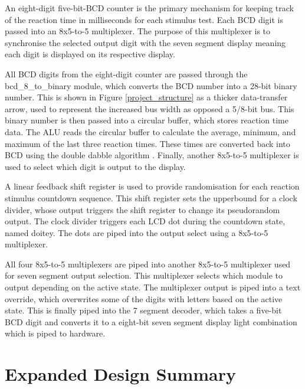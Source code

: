 \documentclass[11pt]{article}
\begin{document}
An eight-digit five-bit-BCD counter is the primary mechanism for keeping track of the reaction time in milliseconds for each stimulus test. Each BCD digit is passed into an 8x5-to-5 multiplexer. The purpose of this multiplexer is to synchronise the selected output digit with the seven segment display meaning each digit is displayed on its respective display.

All BCD digits from the eight-digit counter are passed through the bcd\_8\_to\_binary module, which converts the BCD number into a 28-bit binary number. This is shown in Figure \ref{project_structure} as a thicker data-transfer arrow, used to represent the increased bus width as opposed a 5/8-bit bus. This binary number is then passed into a circular buffer, which stores reaction time data. The ALU reads the circular buffer to calculate the average, minimum, and maximum of the last three reaction times. These times are converted back into BCD using the double dabble algorithm \cite{double_dabble}. Finally, another 8x5-to-5 multiplexer is used to select which digit is output to the display.

A linear feedback shift register is used to provide randomisation for each reaction stimulus countdown sequence. This shift register sets the upperbound for a clock divider, whose output triggers the shift register to change its pseudorandom output. The clock divider triggers each LCD dot during the countdown state, named doitey. The dots are piped into the output select using a 8x5-to-5 multiplexer.

All four 8x5-to-5 multiplexers are piped into another 8x5-to-5 multiplexer used for seven segment output selection. This multiplexer selects which module to output depending on the active state. The multiplexer output is piped into a text override, which overwrites some of the digits with letters based on the active state. This is finally piped into the 7 segment decoder, which takes a five-bit BCD digit and converts it to a eight-bit seven segment display light combination which is piped to hardware.


\section{Expanded Design Summary}
\end{document}

